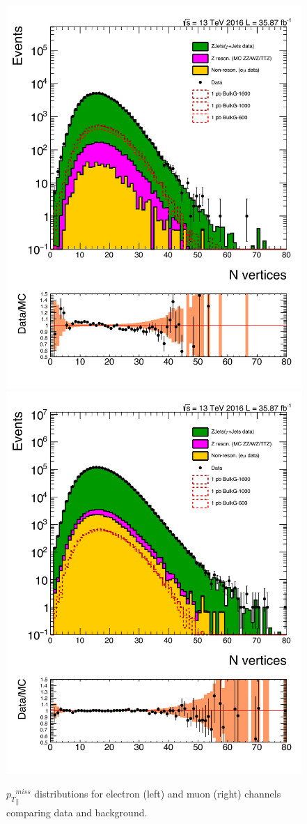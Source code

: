 \begin{figure}[htbp!]
\centering
\includegraphics[width=0.46\linewidth,page=22]{figures/ReMiniSummer16_DT_PhReMiniMCRcFixXsec_GMCPhPtWt_tightzpt50_puWeightsummer16_muoneg_gjet_metfilter_unblind_el_log_1pb.pdf}
\includegraphics[width=0.46\linewidth,page=22]{figures/ReMiniSummer16_DT_PhReMiniMCRcFixXsec_GMCPhPtWt_tightzpt50_puWeightsummer16_muoneg_gjet_metfilter_unblind_mu_log_1pb.pdf}
\caption{${p_{T}}^{miss}_\parallel$ distributions for electron (left) and muon (right)
channels comparing data and background.}
\label{fig:gjet_metpara}
\end{figure}


